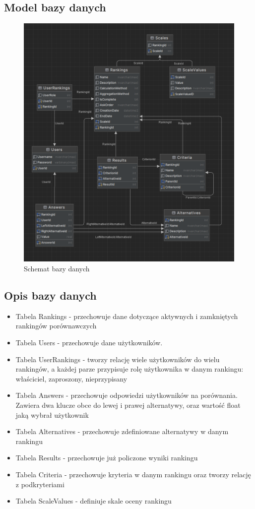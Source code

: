 \documentclass{article}
\begin{document}
\subsection{Model bazy danych}
\begin{figure}[h!]
    \centering
    \includegraphics[width=\linewidth]{db-diagram-vert.PNG}
    \caption{Schemat bazy danych}
\end{figure}

\pagebreak
\subsection{Opis bazy danych}
\begin{itemize}
    \item Tabela Rankings - przechowuje dane dotyczące aktywnych i zamkniętych rankingów porównawczych
    \item Tabela Users - przechowuje dane użytkowników. 
    \item Tabela UserRankings - tworzy relację wiele użytkowników do wielu rankingów, a każdej parze 
    przypisuje rolę użytkownika w danym rankingu: właściciel, zaproszony, nieprzypisany
    \item Tabela Answers - przechowuje odpowiedzi użytkowników na porównania. Zawiera dwa klucze obce 
    do lewej i prawej alternatywy, oraz wartość float jaką wybrał użytkownik
    \item Tabela Alternatives - przechowuje zdefiniowane alternatywy w danym rankingu
    \item Tabela Results - przechowuje już policzone wyniki rankingu
    \item Tabela Criteria - przechowuje kryteria w danym rankingu oraz tworzy relację z podkryteriami
    \item Tabela ScaleValues - definiuje skale oceny rankingu 
\end{itemize}
\end{document}
